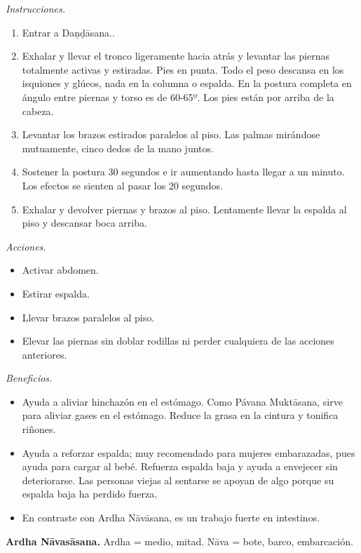 \emph{Instrucciones.}
\begin{enumerate}
\item Entrar a Daṇḍāsana..
\item Exhalar y llevar el tronco ligeramente
hacia atrás y levantar las piernas totalmente
activas y estiradas. Pies en punta. Todo el
peso descansa en los isquiones y glúeos, nada
en la columna o espalda. En la postura
completa en ángulo entre piernas y torso es
de 60-65º. Los pies están por arriba de la
cabeza.
\item Levantar los brazos estirados paralelos
al piso. Las palmas mirándose mutuamente,
cinco dedos de la mano juntos.
\item Sostener la postura 30 segundos e ir
aumentando hasta llegar a un minuto. Los
efectos se sienten al pasar los 20 segundos.
\item Exhalar y devolver piernas y brazos al
piso. Lentamente llevar la espalda al piso y
descansar boca arriba.
\end{enumerate}

\emph{Acciones.}
\begin{itemize}
\item Activar abdomen.
\item Estirar espalda.
\item Llevar brazos paralelos al piso.
\item Elevar las piernas sin doblar rodillas
ni perder cualquiera de las acciones
anteriores.
\end{itemize}

\emph{Beneficios.}
\begin{itemize}
\item Ayuda a aliviar hinchazón en el
estómago. Como Pávana Muktāsana, sirve para
aliviar gases en el estómago. Reduce la grasa
en la cintura y tonifica riñones.
\item Ayuda a reforzar espalda; muy
recomendado para mujeres embarazadas, pues
ayuda para cargar al bebé. Refuerza espalda
baja y ayuda a envejecer sin deteriorarse.
Las personas viejas al sentarse se apoyan de
algo porque su espalda baja ha perdido
fuerza.
\item En contraste con Ardha Nāvāsana, es un
trabajo fuerte en intestinos.
\end{itemize}

\medskip\noindent\textbf{Ardha Nāvasāsana.}
Ardha = medio, mitad. Nāva = bote, barco,
embarcación.

